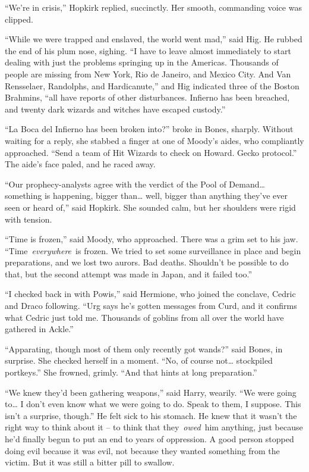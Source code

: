``We're in crisis,'' Hopkirk replied, succinctly. Her smooth, commanding
voice was clipped.

``While we were trapped and enslaved, the world went mad,'' said Hig. He
rubbed the end of his plum nose, sighing. ``I have to leave almost
immediately to start dealing with just the problems springing up in the
Americas. Thousands of people are missing from New York, Rio de Janeiro,
and Mexico City. And Van Rensselaer, Randolphs, and Hardicanute,'' and
Hig indicated three of the Boston Brahmins, ``all have reports of other
disturbances. Infierno has been breached, and twenty dark wizards and
witches have escaped custody.''

``La Boca del Infierno has been broken into?'' broke in Bones, sharply.
Without waiting for a reply, she stabbed a finger at one of Moody's
aides, who compliantly approached. ``Send a team of Hit Wizards to check
on Howard. Gecko protocol.'' The aide's face paled, and he raced away.

``Our prophecy-analysts agree with the verdict of the Pool of
Demand\ldots{} something is happening, bigger than\ldots{} well, bigger
than anything they've ever seen or heard of,'' said Hopkirk. She sounded
calm, but her shoulders were rigid with tension.

``Time is frozen,'' said Moody, who approached. There was a grim set to
his jaw. ``Time~\emph{everywhere}~is frozen. We tried to set some
surveillance in place and begin preparations, and we lost two aurors.
Bad deaths. Shouldn't be possible to do that, but the second attempt was
made in Japan, and it failed too.''

``I checked back in with Powis,'' said Hermione, who joined the
conclave, Cedric and Draco following. ``Urg says he's gotten messages
from Curd, and it confirms what Cedric just told me. Thousands of
goblins from all over the world have gathered in Ackle.''

``Apparating, though most of them only recently got wands?'' said Bones,
in surprise. She checked herself in a moment. ``No, of course
not\ldots{} stockpiled portkeys.'' She frowned, grimly. ``And that hints
at long preparation.''

``We knew they'd been gathering weapons,'' said Harry, wearily. ``We
were going to\ldots{} I don't even know what we were going to do. Speak
to them, I suppose. This isn't a surprise, though.'' He felt sick to his
stomach. He knew that it wasn't the right way to think about it -- to
think that they~\emph{owed}~him anything, just because he'd finally
begun to put an end to years of oppression. A good person stopped doing
evil because it was evil, not because they wanted something from the
victim. But it was still a bitter pill to swallow.

